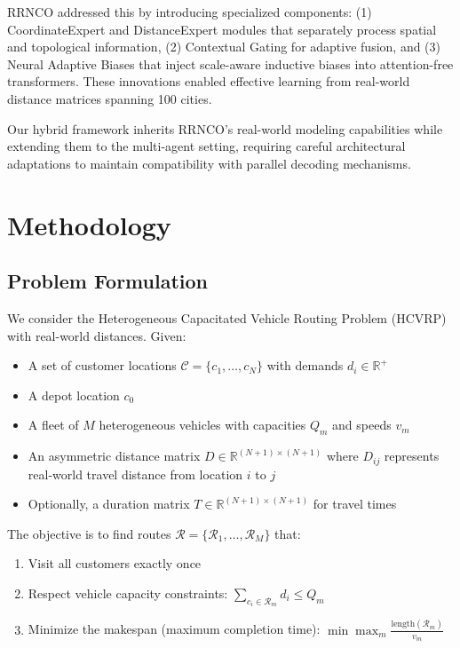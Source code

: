\documentclass[lettersize,journal]{IEEEtran}
\begin{document}
RRNCO \cite{son2026rrnco} addressed this by introducing specialized components: (1) CoordinateExpert and DistanceExpert modules that separately process spatial and topological information, (2) Contextual Gating for adaptive fusion, and (3) Neural Adaptive Biases that inject scale-aware inductive biases into attention-free transformers. These innovations enabled effective learning from real-world distance matrices spanning 100 cities.

Our hybrid framework inherits RRNCO's real-world modeling capabilities while extending them to the multi-agent setting, requiring careful architectural adaptations to maintain compatibility with parallel decoding mechanisms.

\section{Methodology}

\subsection{Problem Formulation}

We consider the Heterogeneous Capacitated Vehicle Routing Problem (HCVRP) with real-world distances. Given:
\begin{itemize}
\item A set of customer locations $\mathcal{C} = \{c_1, \ldots, c_N\}$ with demands $d_i \in \mathbb{R}^+$
\item A depot location $c_0$
\item A fleet of $M$ heterogeneous vehicles with capacities $Q_m$ and speeds $v_m$
\item An asymmetric distance matrix $D \in \mathbb{R}^{(N+1) \times (N+1)}$ where $D_{ij}$ represents real-world travel distance from location $i$ to $j$
\item Optionally, a duration matrix $T \in \mathbb{R}^{(N+1) \times (N+1)}$ for travel times
\end{itemize}

The objective is to find routes $\mathcal{R} = \{\mathcal{R}_1, \ldots, \mathcal{R}_M\}$ that:
\begin{enumerate}
\item Visit all customers exactly once
\item Respect vehicle capacity constraints: $\sum_{c_i \in \mathcal{R}_m} d_i \leq Q_m$
\item Minimize the makespan (maximum completion time): $\min \max_{m} \frac{\text{length}(\mathcal{R}_m)}{v_m}$
\end{enumerate}
\end{document}
